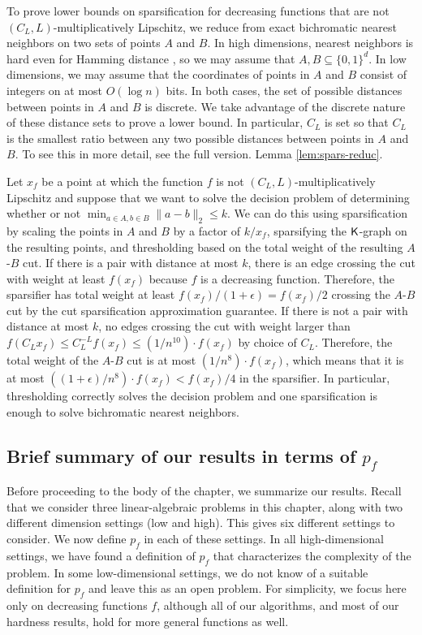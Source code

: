 To prove lower bounds on sparsification for decreasing functions that are not $(C_L,L)$-multiplicatively Lipschitz, we reduce from exact bichromatic nearest neighbors on two sets of points $A$ and $B$. In high dimensions, nearest neighbors is hard even for Hamming distance \cite{r18}, so we may assume that $A,B\subseteq \{0,1\}^d$. In low dimensions, we may assume that the coordinates of points in $A$ and $B$ consist of integers on at most $O(\log n)$ bits. In both cases, the set of possible distances between points in $A$ and $B$ is discrete. We take advantage of the discrete nature of these distance sets to prove a lower bound. In particular, $C_L$ is set so that $C_L$ is the smallest ratio between any two possible distances between points in $A$ and $B$. To see this in more detail, see 
\ifdefined\isfocs
the full version.
\else
Lemma \ref{lem:spars-reduc}.
\fi

Let $x_f$ be a point at which the function $f$ is not $(C_L,L)$-multiplicatively Lipschitz and suppose that we want to solve the decision problem of determining whether or not $\min_{a\in A, b\in B} \|a - b\|_2\le k$. We can do this using sparsification by scaling the points in $A$ and $B$ by a factor of $k/x_f$, sparsifying the $\mathsf{K}$-graph on the resulting points, and thresholding based on the total weight of the resulting $A$-$B$ cut. If there is a pair with distance at most $k$, there is an edge crossing the cut with weight at least $f(x_f)$ because $f$ is a decreasing function. Therefore, the sparsifier has total weight at least $f(x_f)/(1+\epsilon) = f(x_f)/2$ crossing the $A$-$B$ cut by the cut sparsification approximation guarantee. If there is not a pair with distance at most $k$, no edges crossing the cut with weight larger than $f(C_L x_f)\le C_L^{-L} f(x_f)\le ( 1/n^{10} ) \cdot f(x_f)$ by choice of $C_L$. Therefore, the total weight of the $A$-$B$ cut is at most $(1/n^8 ) \cdot f(x_f)$, which means that it is at most $( (1 + \epsilon)/n^8 ) \cdot f(x_f) < f(x_f)/4$ in the sparsifier. In particular, thresholding correctly solves the decision problem and one sparsification is enough to solve bichromatic nearest neighbors.




\subsection{Brief summary of our results in terms of \texorpdfstring{$p_f$}{}}

Before proceeding to the body of the chapter, we summarize our results.
Recall that we consider three linear-algebraic problems in this chapter, along with two different dimension settings (low and high). This gives six different settings to consider. We now define $p_f$ in each of these settings. In all high-dimensional settings, we have found a definition of $p_f$ that characterizes the complexity of the problem. In some low-dimensional settings, we do not know of a suitable definition for $p_f$ and leave this as an open problem. For simplicity, we focus here only on decreasing functions $f$, although all of our algorithms, and most of our hardness results,  hold for more general functions as well.

